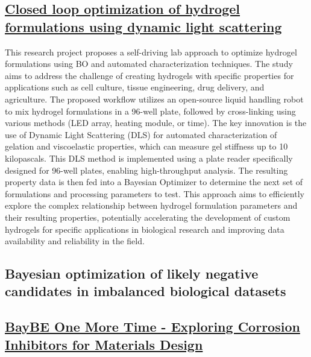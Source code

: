  \subsection*{\href{https://youtu.be/Qbvq7uolQr8}{Closed loop optimization of hydrogel formulations using dynamic light scattering}}

This research project proposes a self-driving lab approach to optimize hydrogel formulations using BO and automated characterization techniques. The study aims to address the challenge of creating hydrogels with specific properties for applications such as cell culture, tissue engineering, drug delivery, and agriculture. The proposed workflow utilizes an open-source liquid handling robot to mix hydrogel formulations in a 96-well plate, followed by cross-linking using various methods (LED array, heating module, or time). The key innovation is the use of Dynamic Light Scattering (DLS)\cite{stetefeld2016dynamic} for automated characterization of gelation and viscoelastic properties, which can measure gel stiffness up to 10 kilopascals. This DLS method is implemented using a plate reader specifically designed for 96-well plates, enabling high-throughput analysis. The resulting property data is then fed into a Bayesian Optimizer to determine the next set of formulations and processing parameters to test. This approach aims to efficiently explore the complex relationship between hydrogel formulation parameters and their resulting properties, potentially accelerating the development of custom hydrogels for specific applications in biological research and improving data availability and reliability in the field.
 \subsection*{Bayesian optimization of likely negative candidates in imbalanced biological datasets}


 \subsection*{\href{https://www.youtube.com/watch?v=kIRxGdwmLSY}{BayBE One More Time - Exploring Corrosion Inhibitors for Materials Design}}

